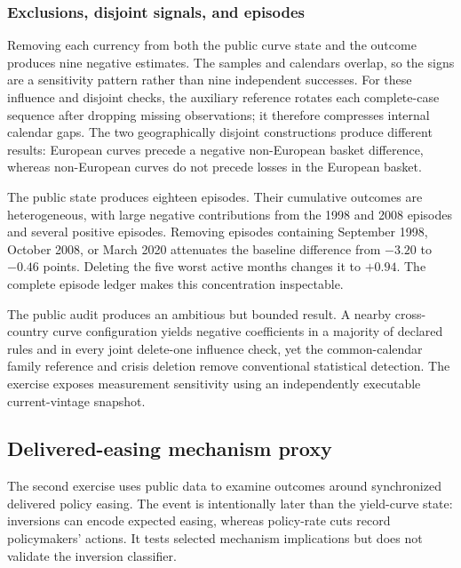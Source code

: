 \subsubsection{Exclusions, disjoint signals, and episodes}

Removing each currency from both the public curve state and the outcome produces nine negative estimates. The samples and calendars overlap, so the signs are a sensitivity pattern rather than nine independent successes. For these influence and disjoint checks, the auxiliary reference rotates each complete-case sequence after dropping missing observations; it therefore compresses internal calendar gaps. The two geographically disjoint constructions produce different results: European curves precede a negative non-European basket difference, whereas non-European curves do not precede losses in the European basket.



The public state produces eighteen episodes. Their cumulative outcomes are heterogeneous, with large negative contributions from the 1998 and 2008 episodes and several positive episodes. Removing episodes containing September 1998, October 2008, or March 2020 attenuates the baseline difference from $-3.20$ to $-0.46$ points. Deleting the five worst active months changes it to $+0.94$. The complete episode ledger makes this concentration inspectable.



The public audit produces an ambitious but bounded result. A nearby cross-country curve configuration yields negative coefficients in a majority of declared rules and in every joint delete-one influence check, yet the common-calendar family reference and crisis deletion remove conventional statistical detection. The exercise exposes measurement sensitivity using an independently executable current-vintage snapshot.

\subsection{Delivered-easing mechanism proxy}

The second exercise uses public data to examine outcomes around synchronized delivered policy easing. The event is intentionally later than the yield-curve state: inversions can encode expected easing, whereas policy-rate cuts record policymakers' actions. It tests selected mechanism implications but does not validate the inversion classifier.

